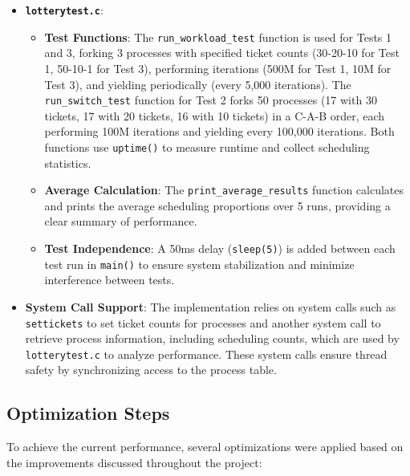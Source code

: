 \documentclass{article}
\begin{document}
\begin{itemize}
    \item \textbf{\texttt{lotterytest.c}}:
        \begin{itemize}
            \item \textbf{Test Functions}: The \texttt{run\_workload\_test} function is used for Tests 1 and 3, forking 3 processes with specified ticket counts (30-20-10 for Test 1, 50-10-1 for Test 3), performing iterations (500M for Test 1, 10M for Test 3), and yielding periodically (every 5,000 iterations). The \texttt{run\_switch\_test} function for Test 2 forks 50 processes (17 with 30 tickets, 17 with 20 tickets, 16 with 10 tickets) in a C-A-B order, each performing 100M iterations and yielding every 100,000 iterations. Both functions use \texttt{uptime()} to measure runtime and collect scheduling statistics.
            \item \textbf{Average Calculation}: The \texttt{print\_average\_results} function calculates and prints the average scheduling proportions over 5 runs, providing a clear summary of performance.
            \item \textbf{Test Independence}: A 50ms delay (\texttt{sleep(5)}) is added between each test run in \texttt{main()} to ensure system stabilization and minimize interference between tests.
        \end{itemize}
    
    \item \textbf{System Call Support}: The implementation relies on system calls such as \texttt{settickets} to set ticket counts for processes and another system call to retrieve process information, including scheduling counts, which are used by \texttt{lotterytest.c} to analyze performance. These system calls ensure thread safety by synchronizing access to the process table.
\end{itemize}

\subsection{Optimization Steps}
To achieve the current performance, several optimizations were applied based on the improvements discussed throughout the project:
\end{document}
